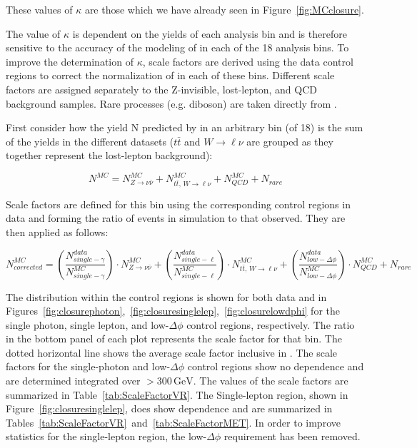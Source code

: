 These values of $\kappa$ are those which we have already seen in Figure~\ref{fig:MCclosure}.

The value of $\kappa$ is dependent on the yields of each analysis bin and is therefore sensitive to the accuracy of the modeling of  in each of the 18 analysis bins. To improve the determination of $\kappa$, scale factors are derived using the data control regions to correct the normalization of  in each of these bins. Different scale factors are assigned separately to the Z-invisible, lost-lepton, and QCD background  samples. Rare processes (e.g. diboson) are taken directly from .

First consider how the yield N predicted by  in an arbitrary bin (of 18) is the sum of the yields in the different  datasets ($t\bar{t}$ and $W\rightarrow\ell\nu$ are grouped as they together represent the lost-lepton background):

\begin{equation}
N^{MC} = N_{Z\rightarrow\nu\bar{\nu}}^{MC} + N_{t\bar{t},\,W\rightarrow\ell\nu}^{MC} + N_{QCD}^{MC} + N_{rare}
\end{equation}

Scale factors are defined for this bin using the corresponding control regions in data and forming the ratio of events in simulation to that observed. They are then applied as follows:

\begin{equation}
N_{corrected}^{MC} = \left(\frac{N_{single-\gamma}^{data}}{N_{single-\gamma}^{MC}}\right) \cdot N_{Z\rightarrow\nu\bar{\nu}}^{MC} + \left(\frac{N^{data}_{single-\ell}}{N^{MC}_{single-\ell}}\right) \cdot N^{MC}_{t\bar{t},\,W\rightarrow\ell\nu} + \left(\frac{N^{data}_{low-\Delta\phi}}{N^{MC}_{low-\Delta\phi}}\right) \cdot N_{QCD}^{MC} + N_{rare}
\end{equation}

The \ptmiss distribution within the control regions is shown for both data and  in Figures~\ref{fig:closurephoton},~\ref{fig:closuresinglelep},~\ref{fig:closurelowdphi} for the single photon, single lepton, and low-$\Delta\phi$ control regions, respectively. The ratio in the bottom panel of each plot represents the scale factor for that \ptmiss bin. The dotted horizontal line shows the average scale factor inclusive in \ptmiss. The scale factors for the single-photon and low-$\Delta\phi$ control regions show no \ptmiss dependence and are determined integrated over \ptmiss$>300\,\textrm{GeV}$. The values of the scale factors are summarized in Table~\ref{tab:ScaleFactorVR}. The Single-lepton region, shown in Figure~\ref{fig:closuresinglelep}, does show \ptmiss dependence and are summarized in Tables~\ref{tab:ScaleFactorVR}~and~\ref{tab:ScaleFactorMET}.  In order to improve statistics for the single-lepton region, the low-$\Delta\phi$ requirement has been removed.


